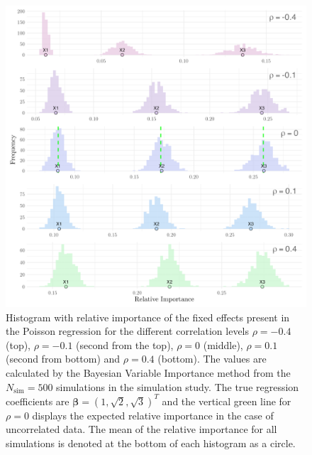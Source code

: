 \begin{figure}[H]
  \centering
  \includegraphics[width=1.1\linewidth]{Figures/Simulation study/Fixed_combined_poisson.png}
  \caption[Relative importance of the fixed effects in Poisson GLMM]{Histogram with relative importance of the fixed effects present in the Poisson regression for the different correlation levels $\rho=-0.4$ (top), $\rho=-0.1$ (second from the top), $\rho=0$ (middle), $\rho=0.1$ (second from bottom) and $\rho=0.4$ (bottom). The values are calculated by the Bayesian Variable Importance method from the $N_{\text{sim}}=500$ simulations in the simulation study. The true regression coefficients are $\boldsymbol{\beta}=(1, \sqrt{2}, \sqrt{3})^T$ and the vertical green line for $\rho=0$ displays the expected relative importance in the case of uncorrelated data. The mean of the relative importance for all simulations is denoted at the bottom of each histogram as a circle.}
  \label{fig:fixed_combined_poisson}
\end{figure}
